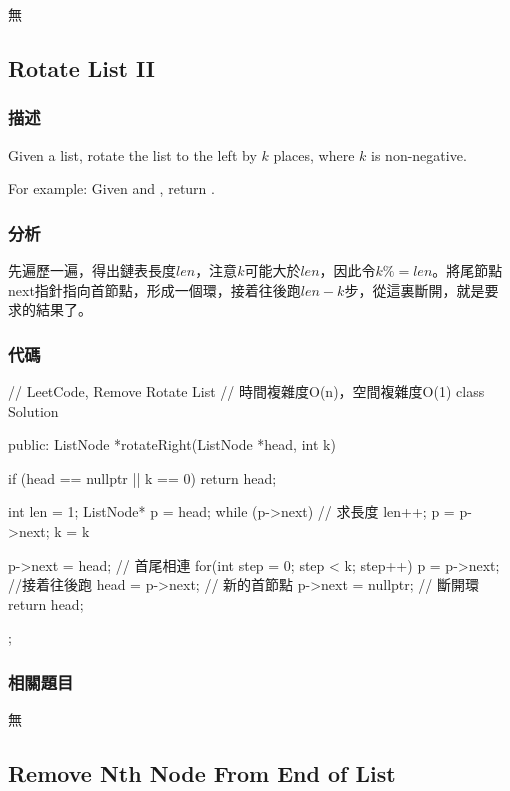 \begindot
\item 無
\myenddot

\subsection{Rotate List II}
\label{sec:rotate-list-ii}


\subsubsection{描述}
Given a list, rotate the list to the left by $k$ places, where $k$ is non-negative.

For example:
Given  and , return .


\subsubsection{分析}
先遍歷一遍，得出鏈表長度$len$，注意$k$可能大於$len$，因此令$k \%= len$。將尾節點next指針指向首節點，形成一個環，接着往後跑$len-k$步，從這裏斷開，就是要求的結果了。


\subsubsection{代碼}
\begin{Code}
// LeetCode, Remove Rotate List
// 時間複雜度O(n)，空間複雜度O(1)
class Solution {
public:
    ListNode *rotateRight(ListNode *head, int k) {
        if (head == nullptr || k == 0) return head;

        int len = 1;
        ListNode* p = head;
        while (p->next) { // 求長度
            len++;
            p = p->next;
        }
        k = k %

        p->next = head; // 首尾相連
        for(int step = 0; step < k; step++) {
            p = p->next;  //接着往後跑
        }
        head = p->next; // 新的首節點
        p->next = nullptr; // 斷開環
        return head;
    }
};
\end{Code}


\subsubsection{相關題目}

\begindot
\item 無
\myenddot


\subsection{Remove Nth Node From End of List}
\label{sec:remove-nth-node-from-end-of-list}


